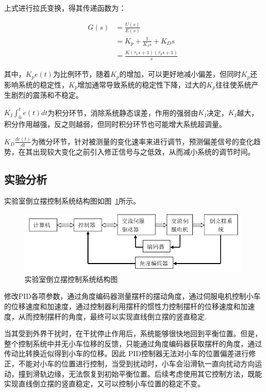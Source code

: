 上式进行拉氏变换，得其传递函数为：

\begin{equation}
\begin{aligned}
G(s)&=\frac{U(s)}{E(s)}\\
&=K_p+\frac{1}{K_Is}+K_Ds\\
&=\frac{K(\tau_1s+1)(\tau_2s+1)}{s}
\end{aligned}
\end{equation}

其中，$K_pe(t)$为比例环节，随着$K_p$的增加，可以更好地减小偏差，但同时$K_p$还影响系统的稳定性，$K_p$增加通常导致系统的稳定性下降，过大的$K_p$往往使系统产生剧烈的震荡和不稳定。

$K_I\int_0^te(t)dt$为积分环节，消除系统静态误差，作用的强弱由$K_I$决定，$K_I$越大，积分作用越强，反之则越弱，但同时积分环节也可能增大系统超调量。

$K_D\frac{de(t)}{dt}$为微分环节，针对被测量的变化速率来进行调节，预测偏差信号的变化趋势，在其出现较大变化之前引入修正信号与之低效，从而减小系统的调节时间。

\subsection{实验分析}

实验室倒立摆控制系统结构图如图~\ref{fig:structure}所示。

\begin{figure}[hbpt]
\centering
\includegraphics[width=12cm]{structure.png}
\caption{实验室倒立摆控制系统结构图}\label{fig:structure}
\end{figure}

修改PID各项参数，通过角度编码器测量摆杆的摆动角度，通过伺服电机控制小车的位移速度和加速度，通过控制器利用摆杆的惯性力控制摆杆的位移速度和加速度，从而控制摆杆的角度，最终可以实现直线倒立摆的竖直稳定.

当其受到外界干扰时，在干扰停止作用后，系统能够很快地回到平衡位置。但是，整个控制系统中并无小车位移的反馈，只能通过角度编码器获取摆杆的角度，通过传动比转换近似得到小车的位移。因此 PID控制器无法对小车的位置偏差进行修正，不能对小车的位置进行控制，当受到扰动时，小车会沿滑轨一直向扰动方向运动，撞到滑轨边缘，无法恢复到初始平衡位置。后续考虑使用其它控制方法，既能实现直线倒立摆的竖直稳定，又可以控制小车位置的稳定不变。

